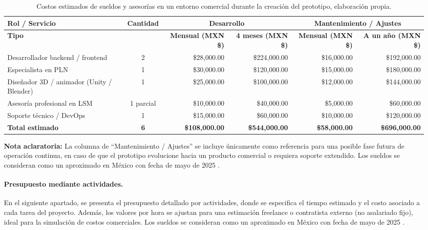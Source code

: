 \begin{table}[H]
	\centering
	\renewcommand{\arraystretch}{1.6}
	\setlength{\tabcolsep}{10pt}
	\Huge
	\begin{adjustbox}{max width=\textwidth}
		\begin{tabular}{|p{5.8cm}|c|r|r|r|r|}
			\hline
			\textbf{Rol / Servicio} & \textbf{Cantidad} & \multicolumn{2}{c|}{\textbf{Desarrollo}} & \multicolumn{2}{c|}{\textbf{Mantenimiento / Ajustes}} \\ \hline
			\textbf{Tipo} & & \textbf{Mensual (MXN \$)} & \textbf{4 meses (MXN \$)} & \textbf{Mensual (MXN \$)} & \textbf{A un año (MXN \$)} \\ \hline
			Desarrollador backend / frontend & 2 & \$28,000.00 & \$224,000.00 & \$16,000.00 & \$192,000.00 \\ \hline
			Especialista en PLN & 1 & \$30,000.00 & \$120,000.00 & \$15,000.00 & \$180,000.00 \\ \hline
			Diseñador 3D / animador (Unity / Blender) & 1 & \$25,000.00 & \$100,000.00 & \$12,000.00 & \$144,000.00 \\ \hline
			Asesoría profesional en LSM & 1 parcial & \$10,000.00 & \$40,000.00 & \$5,000.00 & \$60,000.00 \\ \hline
			Soporte técnico / DevOps & 1 & \$15,000.00 & \$60,000.00 & \$10,000.00 & \$120,000.00 \\ \hline
			\textbf{Total estimado} & \textbf{6} & \textbf{\$108,000.00} & \textbf{\$544,000.00} & \textbf{\$58,000.00} & \textbf{\$696,000.00} \\ \hline
		\end{tabular}
	\end{adjustbox}
	\caption[Costos estimados de sueldos y asesorías en un entorno comercial durante la creación del prototipo]{Costos estimados de sueldos y asesorías en un entorno comercial durante la creación del prototipo, elaboración propia.}	
	\label{tab:sueldos_comercial}
\end{table}



\noindent \textbf{Nota aclaratoria:}  
La columna de “Mantenimiento / Ajustes” se incluye únicamente como referencia para una posible fase futura de operación continua, en caso de que el prototipo evolucione hacia un producto comercial o requiera soporte extendido. Los sueldos se consideran como un aproximado en México con fecha de mayo de 2025 \cite{ref64, ref65, ref66, ref67, ref68, ref69, ref70}. 


\paragraph{\textbf{Presupuesto mediante actividades.}} 
En el siguiente apartado, se presenta el presupuesto detallado por actividades, donde se especifica el tiempo estimado y el costo asociado a cada tarea del proyecto. Además, los valores por hora se ajustan para una estimación freelance o contratista externo (no asalariado fijo), ideal para la simulación de costos comerciales.  Los sueldos se consideran como un aproximado en México con fecha de mayo de 2025 \cite{ref71, ref72, ref73, ref74, ref75, ref76, ref77}.

